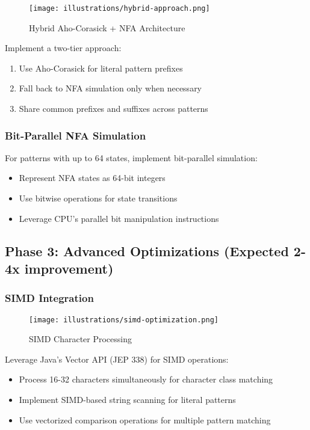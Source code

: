 \documentclass[11pt,a4paper]{article}
\begin{document}
\begin{figure}[htbp]
\centering
\texttt{[image: illustrations/hybrid-approach.png]}
\caption{Hybrid Aho-Corasick + NFA Architecture}
\label{fig:hybrid}
\end{figure}

Implement a two-tier approach:
\begin{enumerate}
\item Use Aho-Corasick for literal pattern prefixes
\item Fall back to NFA simulation only when necessary
\item Share common prefixes and suffixes across patterns
\end{enumerate}

\subsubsection{Bit-Parallel NFA Simulation}

For patterns with up to 64 states, implement bit-parallel simulation:
\begin{itemize}
\item Represent NFA states as 64-bit integers
\item Use bitwise operations for state transitions
\item Leverage CPU's parallel bit manipulation instructions
\end{itemize}

\subsection{Phase 3: Advanced Optimizations (Expected 2-4x improvement)}

\subsubsection{SIMD Integration}

\begin{figure}[htbp]
\centering
\texttt{[image: illustrations/simd-optimization.png]}
\caption{SIMD Character Processing}
\label{fig:simd}
\end{figure}

Leverage Java's Vector API (JEP 338) for SIMD operations:
\begin{itemize}
\item Process 16-32 characters simultaneously for character class matching
\item Implement SIMD-based string scanning for literal patterns
\item Use vectorized comparison operations for multiple pattern matching
\end{itemize}
\end{document}
